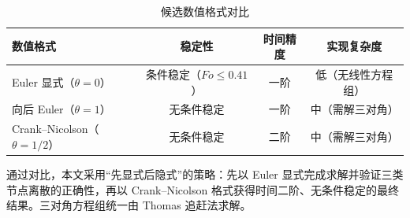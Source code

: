 \begin{table}[H]
  \centering
  \caption{候选数值格式对比}
  \label{tab:algo}
  \begin{tabular}{lccc}
    \toprule
    数值格式 & 稳定性 & 时间精度 & 实现复杂度 \\
    \midrule
    Euler 显式（$\theta=0$） & 条件稳定（$Fo\le0.41$） & 一阶 & 低（无线性方程组） \\
    向后 Euler（$\theta=1$） & 无条件稳定 & 一阶 & 中（需解三对角） \\
    Crank--Nicolson（$\theta=1/2$） & 无条件稳定 & 二阶 & 中（需解三对角） \\
    \bottomrule
  \end{tabular}
\end{table}

通过对比，本文采用“先显式后隐式”的策略：先以 Euler 显式完成求解并验证三类节点离散的正确性，再以 Crank--Nicolson 格式获得时间二阶、无条件稳定的最终结果。三对角方程组统一由 Thomas 追赶法求解。
